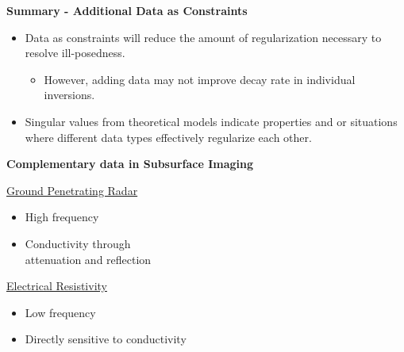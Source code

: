 \documentclass[
paper=A6,landscape,
fontsize=11pt, %
pagesize, %
parskip=half-, %
]{scrartcl} %
\theoremstyle{mythmstyle} %
\begin{document}
%
%
%
%
%
{\large \bf Summary - Additional Data as Constraints }
\begin{itemize}
\item Data as constraints will reduce the amount of regularization necessary to resolve ill-posedness.
\begin{itemize}
\item However, adding data may not improve decay rate in individual inversions.
\end{itemize}
\item Singular values from theoretical models indicate properties and or situations where different data types effectively regularize each
other.
\end{itemize}
\clearpage

\vspace*{-.5in}

{\large \bf Complementary data in Subsurface Imaging}
\begin{multicols}{2}
\centerline{\underline{Ground Penetrating Radar}}
\begin{itemize} \item \small {High frequency}
\item \small Conductivity through \\ attenuation and reflection
\end{itemize}
\vspace*{.2in}
\centerline{}
\columnbreak	
\centerline{\underline{Electrical Resistivity}}
\begin{itemize} \item \small Low frequency
\item \small Directly sensitive to conductivity
\end{itemize}
\vspace*{.2in}
\centerline{}
\end{multicols}
\clearpage
\end{document}
